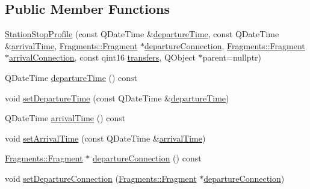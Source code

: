 \subsection*{Public Member Functions}
\begin{DoxyCompactItemize}
\item 
\mbox{\hyperlink{classCSA_1_1StationStopProfile_aaad218564513e0a629a4b1e596c24d7f}{Station\+Stop\+Profile}} (const Q\+Date\+Time \&\mbox{\hyperlink{classCSA_1_1StationStopProfile_afef345e7edf4dbd8effec87ab565d030}{departure\+Time}}, const Q\+Date\+Time \&\mbox{\hyperlink{classCSA_1_1StationStopProfile_a33c9f8331164a7af0884a26ee24940b7}{arrival\+Time}}, \mbox{\hyperlink{classFragments_1_1Fragment}{Fragments\+::\+Fragment}} $\ast$\mbox{\hyperlink{classCSA_1_1StationStopProfile_ac75cf7fddd5db7abd8b788849b78263e}{departure\+Connection}}, \mbox{\hyperlink{classFragments_1_1Fragment}{Fragments\+::\+Fragment}} $\ast$\mbox{\hyperlink{classCSA_1_1StationStopProfile_a6cfce145f35c2263a21a207844470bec}{arrival\+Connection}}, const qint16 \mbox{\hyperlink{classCSA_1_1StationStopProfile_a10a03b9f10dec06eac01f970c77b3ada}{transfers}}, Q\+Object $\ast$parent=nullptr)
\item 
Q\+Date\+Time \mbox{\hyperlink{classCSA_1_1StationStopProfile_afef345e7edf4dbd8effec87ab565d030}{departure\+Time}} () const
\item 
void \mbox{\hyperlink{classCSA_1_1StationStopProfile_a55ed54cba17d902390d2030003177059}{set\+Departure\+Time}} (const Q\+Date\+Time \&\mbox{\hyperlink{classCSA_1_1StationStopProfile_afef345e7edf4dbd8effec87ab565d030}{departure\+Time}})
\item 
Q\+Date\+Time \mbox{\hyperlink{classCSA_1_1StationStopProfile_a33c9f8331164a7af0884a26ee24940b7}{arrival\+Time}} () const
\item 
void \mbox{\hyperlink{classCSA_1_1StationStopProfile_ac6690454adee23fde8d7ff5abd42396d}{set\+Arrival\+Time}} (const Q\+Date\+Time \&\mbox{\hyperlink{classCSA_1_1StationStopProfile_a33c9f8331164a7af0884a26ee24940b7}{arrival\+Time}})
\item 
\mbox{\hyperlink{classFragments_1_1Fragment}{Fragments\+::\+Fragment}} $\ast$ \mbox{\hyperlink{classCSA_1_1StationStopProfile_ac75cf7fddd5db7abd8b788849b78263e}{departure\+Connection}} () const
\item 
void \mbox{\hyperlink{classCSA_1_1StationStopProfile_a2d53816b9df7e028d96591006c56bc30}{set\+Departure\+Connection}} (\mbox{\hyperlink{classFragments_1_1Fragment}{Fragments\+::\+Fragment}} $\ast$\mbox{\hyperlink{classCSA_1_1StationStopProfile_ac75cf7fddd5db7abd8b788849b78263e}{departure\+Connection}})

\end{DoxyCompactItemize}
